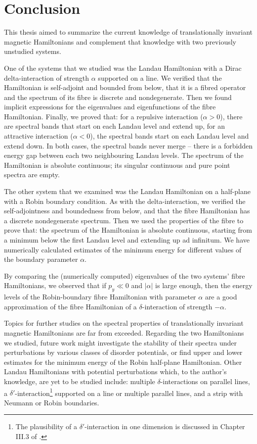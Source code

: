 \chapter*{Conclusion}

This thesis aimed to summarize the current knowledge of translationally invariant magnetic Hamiltonians and complement that knowledge with two previously unstudied systems.

One of the systems that we studied was the Landau Hamiltonian with a Dirac delta-interaction of strength $\alpha$ supported on a line. We verified that the Hamiltonian is self-adjoint and bounded from below, that it is a fibred operator and the spectrum of its fibre is discrete and nondegenerate. Then we found implicit expressions for the eigenvalues and eigenfunctions of the fibre Hamiltonian. Finally, we proved that: for a repulsive interaction ($\alpha>0$), there are spectral bands that start on each Landau level and extend up, for an attractive interaction ($\alpha < 0$), the spectral bands start on each Landau level and extend down. In both cases, the spectral bands never merge – there is a forbidden energy gap between each two neighbouring Landau levels. The spectrum of the Hamiltonian is absolute continuous; its singular continuous and pure point spectra are empty.

The other system that we examined was the Landau Hamiltonian on a half-plane with a Robin boundary condition. As with the delta-interaction, we verified the self-adjointness and boundedness from below, and that the fibre Hamiltonian has a discrete nondegenerate spectrum. Then we used the properties of the fibre to prove that: the spectrum of the Hamiltonian is absolute continuous, starting from a minimum below the first Landau level and extending up ad infinitum. We have numerically calculated estimates of the minimum energy for different values of the boundary parameter $\alpha$.

By comparing the (numerically computed) eigenvalues of the two systems' fibre Hamiltonians, we observed that if $p_y \ll 0$ and $|\alpha|$ is large enough, then the energy levels of the Robin-boundary fibre Hamiltonian with parameter $\alpha$ are a good approximation of the fibre Hamiltonian of a $\delta$-interaction of strength $-\alpha$.

Topics for further studies on the spectral properties of translationally invariant magnetic Hamiltonians are far from exceeded. Regarding the two Hamiltonians we studied, future work might investigate the stability of their spectra under perturbations by various classes of disorder potentials, or find upper and lower estimates for the minimum energy of the Robin half-plane Hamiltonian. Other Landau Hamiltonians with potential perturbations which, to the author's knowledge, are yet to be studied include: multiple $\delta$-interactions on parallel lines, a $\delta'$-interaction\footnote{The plausibility of a $\delta'$-interaction in one dimension is discussed in Chapter III.3 of \citet{Albeverio2005}.} supported on a line or multiple parallel lines, and a strip with Neumann or Robin boundaries.
